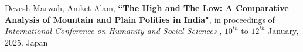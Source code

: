 \begin{enumerate}[label={[P\arabic*]}]  
    \item Devesh Marwah, Aniket Alam, \textbf{``The High and The Low: A Comparative Analysis of Mountain and Plain Polities in India"}, in proceedings of {\it International Conference on Humanity and Social Sciences }  , $10^{th}$ to $12^{th}$ January, 2025. Japan
    
    
    
\end{enumerate}
